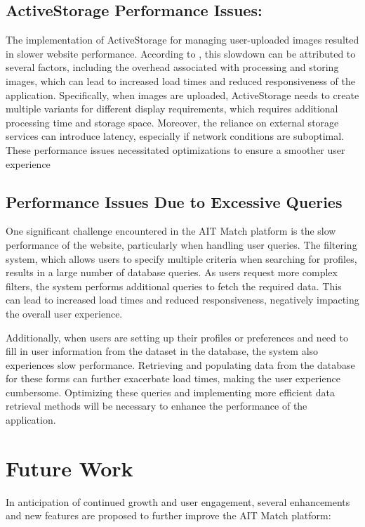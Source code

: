     \newpage
    \subsection{ActiveStorage Performance Issues:} The implementation of ActiveStorage for managing user-uploaded images resulted in slower website performance. According to \cite{rails_active_storage}, this slowdown can be attributed to several factors, including the overhead associated with processing and storing images, which can lead to increased load times and reduced responsiveness of the application. Specifically, when images are uploaded, ActiveStorage needs to create multiple variants for different display requirements, which requires additional processing time and storage space. Moreover, the reliance on external storage services can introduce latency, especially if network conditions are suboptimal. These performance issues necessitated optimizations to ensure a smoother user experience

    \subsection{Performance Issues Due to Excessive Queries}
    One significant challenge encountered in the AIT Match platform is the slow performance of the website, particularly when handling user queries. The filtering system, which allows users to specify multiple criteria when searching for profiles, results in a large number of database queries. As users request more complex filters, the system performs additional queries to fetch the required data. This can lead to increased load times and reduced responsiveness, negatively impacting the overall user experience.
    
    Additionally, when users are setting up their profiles or preferences and need to fill in user information from the dataset in the database, the system also experiences slow performance. Retrieving and populating data from the database for these forms can further exacerbate load times, making the user experience cumbersome. Optimizing these queries and implementing more efficient data retrieval methods will be necessary to enhance the performance of the application.


\newpage
\section{Future Work}
In anticipation of continued growth and user engagement, several enhancements and new features are proposed to further improve the AIT Match platform:

